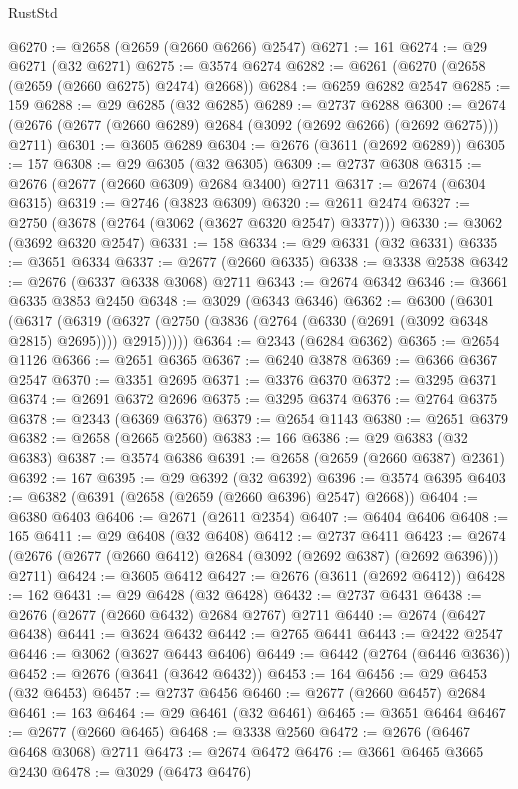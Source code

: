 \begin{lexlean}{RustStd}
\begin{coremodule}
@6270 := @2658 (@2659 (@2660 @6266) @2547)
@6271 := 161
@6274 := @29 @6271 (@32 @6271)
@6275 := @3574 @6274
@6282 := @6261 (@6270 (@2658 (@2659 (@2660 @6275) @2474) @2668))
@6284 := @6259 @6282 @2547
@6285 := 159
@6288 := @29 @6285 (@32 @6285)
@6289 := @2737 @6288
@6300 := @2674 (@2676 (@2677 (@2660 @6289) @2684 (@3092 (@2692 @6266) (@2692 @6275))) @2711)
@6301 := @3605 @6289
@6304 := @2676 (@3611 (@2692 @6289))
@6305 := 157
@6308 := @29 @6305 (@32 @6305)
@6309 := @2737 @6308
@6315 := @2676 (@2677 (@2660 @6309) @2684 @3400) @2711
@6317 := @2674 (@6304 @6315)
@6319 := @2746 (@3823 @6309)
@6320 := @2611 @2474
@6327 := @2750 (@3678 (@2764 (@3062 (@3627 @6320 @2547) @3377)))
@6330 := @3062 (@3692 @6320 @2547)
@6331 := 158
@6334 := @29 @6331 (@32 @6331)
@6335 := @3651 @6334
@6337 := @2677 (@2660 @6335)
@6338 := @3338 @2538
@6342 := @2676 (@6337 @6338 @3068) @2711
@6343 := @2674 @6342
@6346 := @3661 @6335 @3853 @2450
@6348 := @3029 (@6343 @6346)
@6362 := @6300
    (@6301
      (@6317
        (@6319 (@6327 (@2750 (@3836 (@2764 (@6330 (@2691 (@3092 @6348 @2815) @2695)))) @2915)))))
@6364 := @2343 (@6284 @6362)
@6365 := @2654 @1126
@6366 := @2651 @6365
@6367 := @6240 @3878
@6369 := @6366 @6367 @2547
@6370 := @3351 @2695
@6371 := @3376 @6370
@6372 := @3295 @6371
@6374 := @2691 @6372 @2696
@6375 := @3295 @6374
@6376 := @2764 @6375
@6378 := @2343 (@6369 @6376)
@6379 := @2654 @1143
@6380 := @2651 @6379
@6382 := @2658 (@2665 @2560)
@6383 := 166
@6386 := @29 @6383 (@32 @6383)
@6387 := @3574 @6386
@6391 := @2658 (@2659 (@2660 @6387) @2361)
@6392 := 167
@6395 := @29 @6392 (@32 @6392)
@6396 := @3574 @6395
@6403 := @6382 (@6391 (@2658 (@2659 (@2660 @6396) @2547) @2668))
@6404 := @6380 @6403
@6406 := @2671 (@2611 @2354)
@6407 := @6404 @6406
@6408 := 165
@6411 := @29 @6408 (@32 @6408)
@6412 := @2737 @6411
@6423 := @2674 (@2676 (@2677 (@2660 @6412) @2684 (@3092 (@2692 @6387) (@2692 @6396))) @2711)
@6424 := @3605 @6412
@6427 := @2676 (@3611 (@2692 @6412))
@6428 := 162
@6431 := @29 @6428 (@32 @6428)
@6432 := @2737 @6431
@6438 := @2676 (@2677 (@2660 @6432) @2684 @2767) @2711
@6440 := @2674 (@6427 @6438)
@6441 := @3624 @6432
@6442 := @2765 @6441
@6443 := @2422 @2547
@6446 := @3062 (@3627 @6443 @6406)
@6449 := @6442 (@2764 (@6446 @3636))
@6452 := @2676 (@3641 (@3642 @6432))
@6453 := 164
@6456 := @29 @6453 (@32 @6453)
@6457 := @2737 @6456
@6460 := @2677 (@2660 @6457) @2684
@6461 := 163
@6464 := @29 @6461 (@32 @6461)
@6465 := @3651 @6464
@6467 := @2677 (@2660 @6465)
@6468 := @3338 @2560
@6472 := @2676 (@6467 @6468 @3068) @2711
@6473 := @2674 @6472
@6476 := @3661 @6465 @3665 @2430
@6478 := @3029 (@6473 @6476)

\end{coremodule}
\end{lexlean}
